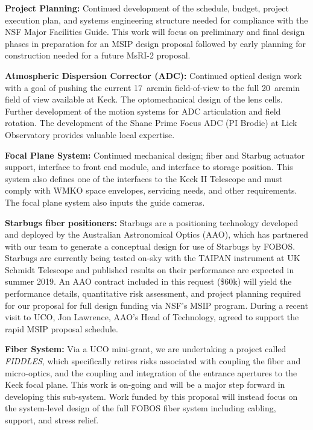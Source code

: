 
\noindent \textbf{Project Planning:} Continued development of the
schedule, budget, project execution plan, and systems engineering
structure needed for compliance with the NSF Major Facilities Guide.
This work will focus on preliminary and final design phases in
preparation for an MSIP design proposal followed by early planning for
construction needed for a future MsRI-2 proposal. 

\noindent \textbf{Atmospheric Dispersion Corrector (ADC):} Continued
optical design work with a goal of pushing the current 17~arcmin
field-of-view to the full 20~arcmin field of view available at Keck.
The optomechanical design of the lens cells. Further development of
the motion systems for ADC articulation and field rotation. The
development of the Shane Prime Focus ADC (PI Brodie) at Lick
Observatory provides valuable local expertise.

\noindent \textbf{Focal Plane System:} Continued mechanical design;
fiber and Starbug actuator support, interface to front end module, and
interface to storage position. This system also defines one of the
interfaces to the Keck II Telescope and must comply with WMKO space
envelopes, servicing needs, and other requirements. The focal plane
system also inputs the guide cameras. 

\noindent \textbf{Starbugs fiber positioners:} Starbugs are a
positioning technology developed and deployed by the Australian
Astronomical Optics (AAO), which has partnered with our team to
generate a conceptual design for use of Starbugs by FOBOS. Starbugs
are currently being tested on-sky with the TAIPAN instrument at UK
Schmidt Telescope and published results on their performance are
expected in summer 2019. An AAO contract included in this request
(\$60k) will yield the performance details, quantitative risk
assessment, and project planning required for our proposal for full
design funding via NSF's MSIP program. During a recent visit to UCO,
Jon Lawrence, AAO's Head of Technology, agreed to support the rapid
MSIP proposal schedule.

\noindent \textbf{Fiber System:} Via a UCO mini-grant, we are
undertaking a project called {\it FIDDLES}, which specifically
retires risks associated with coupling the fiber and micro-optics,
and the coupling and integration of the entrance apertures to the
Keck focal plane. This work is on-going and will be a major step
forward in developing this sub-system. Work funded by this proposal
will instead focus on the system-level design of the full FOBOS fiber
system including cabling, support, and stress relief.

